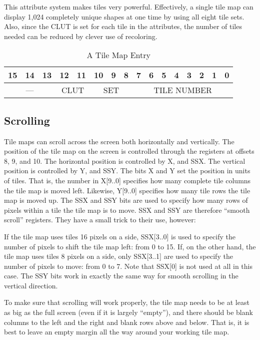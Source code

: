 This attribute system makes tiles very powerful. Effectively, a single tile map can display 1,024 completely unique shapes at one time by using all eight tile sets. Also, since the CLUT is set for each tile in the attributes, the number of tiles needed can be reduced by clever use of recoloring.

\begin{table}[ht]
    \begin{center}
        \begin{tabular}{|c|c|c|c|c|c|c|c|c|c|c|c|c|c|c|c|} \hline
            15 & 14 & 13 & 12 & 11 & 10 & 9 & 8 & 7 & 6 & 5 & 4 & 3 & 2 & 1 & 0 \\ \hline\hline
            \multicolumn{3}{|c|}{---} & \multicolumn{2}{|c|}{CLUT} & \multicolumn{3}{|c|}{SET} & \multicolumn{8}{|c|}{TILE NUMBER} \\ \hline
        \end{tabular}
    \end{center}
    \caption{A Tile Map Entry}
    \label{tab:tile_bits}
\end{table}

\subsection*{Scrolling}

Tile maps can scroll across the screen both horizontally and vertically. The position of the tile map on the screen is controlled through the registers at offsets 8, 9, and 10. The horizontal position is controlled by X, and SSX. The vertical position is controlled by Y, and SSY. The bits X and Y set the position in units of tiles. That is, the number in X[9..0] specifies how many complete tile columns the tile map is moved left. Likewise, Y[9..0] specifies how many tile rows the tile map is moved up. The SSX and SSY bits are used to specify how many rows of pixels within a tile the tile map is to move. SSX and SSY are therefore ``smooth scroll'' registers. They have a small trick to their use, however:

If the tile map uses tiles 16 pixels on a side, SSX[3..0] is used to specify the number of pixels to shift the tile map left: from 0 to 15. If, on the other hand, the tile map uses tiles 8 pixels on a side, only SSX[3..1] are used to specify the number of pixels to move: from 0 to 7. Note that SSX[0] is not used at all in this case. The SSY bits work in exactly the same way for smooth scrolling in the vertical direction.

To make sure that scrolling will work properly, the tile map needs to be at least as big as the full screen (even if it is largely ``empty''), and there should be blank columns to the left and the right and blank rows above and below. That is, it is best to leave an empty margin all the way around your working tile map.


